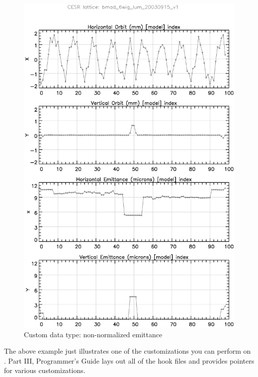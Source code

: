\begin{figure}
  \centering
  \includegraphics[width=5in]{plot-emittance.eps}
  \caption{Custom data type: non-normalized emittance}
  \label{f:plot-emittance}
\end{figure}


The above example just illustrates one of the customizations you can
perform on \tao.  Part III, Programmer's Guide lays out all of the
hook files and provides pointers for various customizations.

